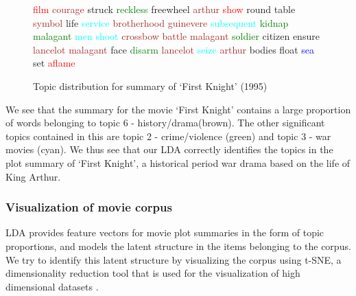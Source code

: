 \documentclass{article} %
\begin{document}
\begin{figure}[H]
	\centering
\textcolor{red}{film}
\textcolor{brown}{courage} 
	struck 
	\textcolor{green}{reckless} 
	freewheel 
	\textcolor{brown}{arthur}
	 \textcolor{red}{show}
	  round 
	  table
	   \textcolor{brown}{symbol}
	   life 
	   \textcolor{cyan}{service}
	    \textcolor{brown}{brotherhood} 
	    \textcolor{brown}{guinevere} 
	    \textcolor{cyan}{subsequent}
	    \textcolor{green}{kidnap}
	    \textcolor{green}{malagant}
	    \textcolor{cyan}{men}
	    \textcolor{cyan}{shoot} 
	    \textcolor{brown}{crossbow} 
	    \textcolor{brown}{battle}
	     \textcolor{brown}{malagant} 
	     \textcolor{green}{soldier}
	      citizen 
	      ensure
	       \textcolor{brown}{lancelot}
	        \textcolor{brown}{malagant}
	         face 
	         \textcolor{green}{disarm} 
	         \textcolor{brown}{lancelot}
	         \textcolor{cyan}{seize} 
	         \textcolor{brown}{arthur}
	          bodies
	           float
	            \textcolor{blue}{sea}
	            set 
	            \textcolor{red}{aflame}
	\caption{Topic distribution for summary of `First Knight' (1995)}
	\label{fig:topic-distr-sample}
\end{figure}

We see that the summary for the movie `First Knight' contains a large
proportion of words belonging to topic 6 - history/drama(brown).
The other significant topics contained in this are topic 2 - crime/violence
(green) and topic 3 - war movies (cyan). We thus see that our LDA correctly 
identifies the topics in the plot summary of `First Knight', a historical period
war drama based on the life of King Arthur.

\subsubsection{Visualization of movie corpus}
LDA provides feature vectors for movie plot summaries in the form of topic
proportions, and models the latent structure in the items belonging to the
corpus. We try to identify this latent structure by visualizing the
corpus using t-SNE, a dimensionality reduction tool that is used for the 
visualization of high dimensional datasets \cite{tSNE}. 
\end{document}
